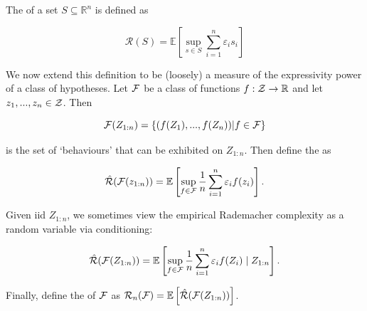 \documentclass[11pt]{scrartcl}
\begin{document}

\begin{definition}
    The  of a set $S \subseteq \mathbb{ R}^n$ is defined as 

    \begin{equation}
        \mathcal{R}(S) = \mathbb{ E} \left[ \sup_{s \in S} \sum_{i=1}^n \varepsilon_i s_i \right]
        \label{Rademacher set definition}
    \end{equation}

    We now extend this definition to be (loosely) a measure of the expressivity power of a class of hypotheses. Let $\mathcal{F}$ be a class of functions $f : \mathcal{Z} \rightarrow \mathbb R$ and let $z_1, ... , z_n \in \mathcal{Z}$.    
    Then
    
    \begin{equation}
        \mathcal{F}(Z_{1:n}) = \{ (f(Z_1), ... , f(Z_n)) | f \in \mathcal{F} \}
    \end{equation}
    
    is the set of `behaviours' that can be exhibited on $Z_{1:n}$.
    Then define the  as 
    
    \begin{equation}
    \label{empirical raddy}
        \hat{\mathcal{R}} (\mathcal{F}(z_{1:n})) = \mathbb{E} \left[  \sup_{f \in \mathcal{F}} \frac1n \sum_{i=1}^n \varepsilon_i f(z_i)  \right].
    \end{equation}
    
    
    Given iid $Z_{1:n}$, we sometimes view the empirical Rademacher complexity as a random variable via conditioning:
    
    \begin{equation}
        \hat{\mathcal{R}} (\mathcal{F}(Z_{1:n})) = \mathbb{E} \left[  \sup_{f \in \mathcal{F}} \frac1n \sum_{i=1}^n \varepsilon_i f(Z_i) \mid Z_{1:n}  \right].
    \label{Empirical rademacher conditioning}
    \end{equation}

    Finally, define the  of $\mathcal{F}$ as $\mathcal{R}_n(\mathcal{F}) = \mathbb{E} \left[ \hat{\mathcal{R}}(\mathcal{F}(Z_{1:n})) \right]$.
\end{definition}

\end{document}
